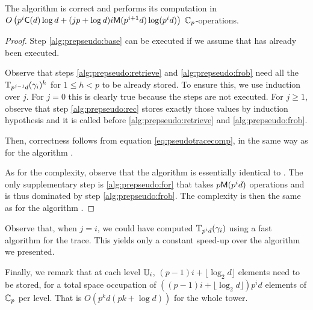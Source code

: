 \sloppy
\begin{theorem}
  The algorithm  is correct and performs its
  computation in $O\left(p^i\mathrm{\sf C}(d)\log d + (jp+\log
  d)i\mathrm{\sf M}(p^{i+1}d)\log(p^id)\right)$ $\mathbb{C}_p$-operations.
\end{theorem}
\fussy
\begin{proof}
  Step \ref{alg:prepseudo:base} can be executed if we assume that
   has already been executed.
  
  Observe that steps \ref{alg:prepseudo:retrieve} and
  \ref{alg:prepseudo:frob} need all the $\operatorname{T}_{p^{j-1}d}(\gamma_i)^h$
  for $1\le h<p$ to be already stored. To ensure this, we use
  induction over $j$. For $j=0$ this is clearly true because the steps
  are not executed. For $j\ge1$, observe that step
  \ref{alg:prepseudo:rec} stores exactly those values by induction
  hypothesis and it is called before \ref{alg:prepseudo:retrieve} and
  \ref{alg:prepseudo:frob}.
  
  Then, correctness follows from equation \eqref{eq:pseudotracecomp},
  in the same way as for the algorithm .

  As for the complexity, observe that the algorithm is essentially
  identical to . The only supplementary step is
  \ref{alg:prepseudo:for} that takes $p\mathrm{\sf M}(p^id)$ operations and is
  thus dominated by step \ref{alg:prepseudo:frob}. The complexity is
  then the same as for the algorithm .
\end{proof}

Observe that, when $j=i$, we could have computed
$\operatorname{T}_{p^id}(\gamma_i)$ using a fast algorithm for the trace. This
yields only a constant speed-up over the algorithm we presented.

Finally, we remark that at each level $\mathbb{U}_i$, $(p-1)i +
\lfloor\log_2d\rfloor$ elements need to be stored, for a total space
occupation of $\left((p-1)i + \lfloor\log_2d\rfloor\right)p^id $
elements of $\mathbb{C}_p$ per level. That is $O(p^kd(pk+\log d))$ for the
whole tower.



%
